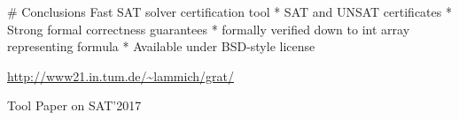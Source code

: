 \documentclass[fleqn]{beamer}
\begin{document}
# Conclusions
  Fast SAT solver certification tool
  * SAT and UNSAT certificates
  * Strong formal correctness guarantees
    * formally verified down to int array representing formula
  * Available under BSD-style license
    
  \vfill 
  \center \url{http://www21.in.tum.de/~lammich/grat/}
    
  \vfill
  Tool Paper on SAT'2017
    
    
    
%   
%     
    
    
\end{document}
